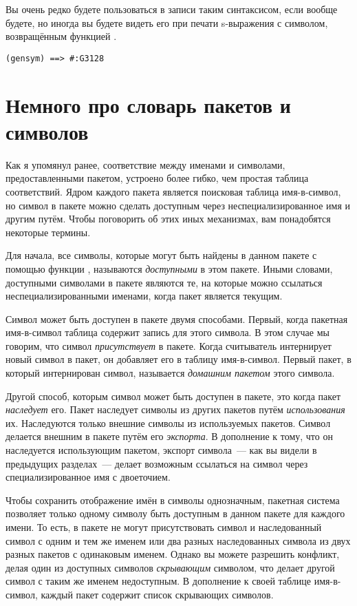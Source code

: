 Вы очень редко будете пользоваться в записи таким синтаксисом, если вообще будете, но
иногда вы будете видеть его при печати s-выражения с символом, возвращённым функцией
.

\begin{lstlisting}
(gensym) ==> #:G3128
\end{lstlisting}

\section{Немного про словарь пакетов и символов}

Как я упомянул ранее, соответствие между именами и символами, предоставленными пакетом,
устроено более гибко, чем простая таблица соответствий.  Ядром каждого пакета является
поисковая таблица имя-в-символ, но символ в пакете можно сделать доступным через
неспециализированное имя и другим путём. Чтобы поговорить об этих иных механизмах, вам
понадобятся некоторые термины.

Для начала, все символы, которые могут быть найдены в данном пакете с помощью функции
, называются \textit{доступными} в этом пакете.  Иными словами,
доступными символами в пакете являются те, на которые можно ссылаться
неспециализированными именами, когда пакет является текущим.

Символ может быть доступен в пакете двумя способами. Первый, когда пакетная имя-в-символ
таблица содержит запись для этого символа. В этом случае мы говорим, что символ
\textit{присутствует} в пакете. Когда считыватель интернирует новый символ в пакет, он
добавляет его в таблицу имя-в-символ. Первый пакет, в который интернирован символ,
называется \textit{домашним пакетом} этого символа.

Другой способ, которым символ может быть доступен в пакете, это когда пакет
\textit{наследует} его.  Пакет наследует символы из других пакетов путём
\textit{использования} их. Наследуются только внешние символы из используемых
пакетов. Символ делается внешним в пакете путём его \textit{экспорта}. В дополнение к
тому, что он наследуется использующим пакетом, экспорт символа~--- как вы видели в
предыдущих разделах~--- делает возможным ссылаться на символ через специализированное имя с
двоеточием.

Чтобы сохранить отображение имён в символы однозначным, пакетная система позволяет только
одному символу быть доступным в данном пакете для каждого имени.  То есть, в пакете не
могут присутствовать символ и наследованный символ с одним и тем же именем или два разных
наследованных символа из двух разных пакетов с одинаковым именем. Однако вы можете
разрешить конфликт, делая один из доступных символов \textit{скрывающим} символом, что
делает другой символ с таким же именем недоступным. В дополнение к своей таблице
имя-в-символ, каждый пакет содержит список скрывающих символов.

